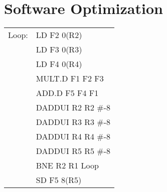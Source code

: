\documentclass{article}
\begin{document}
    \section{Software Optimization}
    \begin{tabular}{c l}
Loop: & LD F2 0(R2) \\
	& LD F3 0(R3) \\
	& LD F4 0(R4) \\
	& MULT.D F1 F2 F3 \\
	& ADD.D F5 F4 F1 \\
	& DADDUI R2 R2 \#-8 \\
	& DADDUI R3 R3 \#-8 \\
	& DADDUI R4 R4 \#-8 \\
	& DADDUI R5 R5 \#-8 \\
	& BNE R2 R1 Loop \\
	& SD F5 8(R5)
    \end{tabular}
\end{document}
